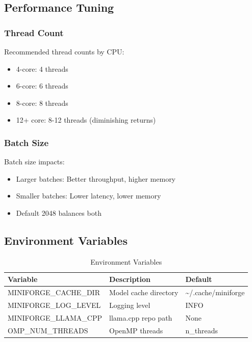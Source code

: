\subsection{Performance Tuning}

\subsubsection{Thread Count}

Recommended thread counts by CPU:

\begin{itemize}
    \item 4-core: 4 threads
    \item 6-core: 6 threads
    \item 8-core: 8 threads
    \item 12+ core: 8-12 threads (diminishing returns)
\end{itemize}

\subsubsection{Batch Size}

Batch size impacts:

\begin{itemize}
    \item Larger batches: Better throughput, higher memory
    \item Smaller batches: Lower latency, lower memory
    \item Default 2048 balances both
\end{itemize}

\subsection{Environment Variables}

\begin{table}[h]
\centering
\caption{Environment Variables}
\label{tab:env_vars}
\begin{tabular}{lll}
\toprule
\textbf{Variable} & \textbf{Description} & \textbf{Default} \\
\midrule
MINIFORGE\_CACHE\_DIR & Model cache directory & \textasciitilde/.cache/miniforge \\
MINIFORGE\_LOG\_LEVEL & Logging level & INFO \\
MINIFORGE\_LLAMA\_CPP & llama.cpp repo path & None \\
OMP\_NUM\_THREADS & OpenMP threads & n\_threads \\
\bottomrule
\end{tabular}
\end{table}
